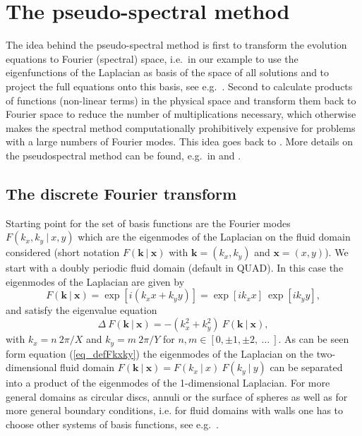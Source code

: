 \chapter{The pseudo-spectral method} \label{sec_pseudspec}
The idea behind the pseudo-spectral method is first to transform
the evolution equations to Fourier (spectral) space, i.e.\ in our
example to use the eigenfunctions of the Laplacian as basis of the
space of all solutions and to project the full equations onto this basis,
see e.g.\ \cite{canutoetal1988}. Second to calculate products of functions
(non-linear terms) in the physical space and transform them back
to Fourier space to reduce the number of multiplications necessary,
which otherwise makes the spectral method computationally prohibitively
expensive for problems with a large numbers of Fourier modes. This idea
goes back to \cite{kreissandoliger1972}. More details on the
pseudospectral method can be found, e.g.\ in \cite{orszag1972}
and \cite{fornberg1987}.
%
\section{The discrete Fourier transform}
%
\label{ssec_evolfourier}
Starting point for the set of basis functions are the Fourier modes 
$F(k_{x},k_{y} \ | \ x,y)$ which are the eigenmodes of the Laplacian 
on the fluid domain considered (short notation 
$F(\mathbf{k} \ | \ \mathbf{x})$ with 
$\mathbf{k} = (k_{x},k_{y})$ and $\mathbf{x} = (x,y)$).  
We start with a doubly periodic fluid domain (default in QUAD). 
In this case the eigenmodes of the Laplacian are given by
\begin{equation} \label{eq_defFkxky}
  F(\mathbf{k} \ | \ \mathbf{x}) 
   = 
 \exp \left[ i  \left(k_{x} x + k_{y} y \right) \right]
   = 
 \exp \left[ i k_{x} x \right] \ 
 \exp \left[ i k_{y} y \right],
\end{equation}
and satisfy the eigenvalue equation
\begin{equation} \label{eq_eigFkxky}
 \Delta \ F(\mathbf{k} \ | \ \mathbf{x})
   =
  - \left( k_{x}^{2} + k_{y}^{2} \right) \ 
    F(\mathbf{k} \ | \ \mathbf{x}),
\end{equation}
with $k_{x} = n \ 2 \pi/X$ and $k_{y} = m \ 2 \pi/Y$ for 
$n,m \in [0,\pm 1, \pm 2,\ \dots \ ]$. As can be seen form equation 
(\ref{eq_defFkxky}) the eigenmodes of the Laplacian on the 
two-dimensional fluid domain 
$F(\mathbf{k} \ | \ \mathbf{x}) = F(k_{x} \ | \ x) \ F(k_{y} \ | \ y)$
can be separated into a product of the eigenmodes of the 
1-dimensional Laplacian. For more general domains
as circular discs, annuli or the surface of spheres as well as 
for more general boundary conditions, i.e. for fluid domains with walls 
one has to choose other systems of basis functions, 
see e.g.\ \cite{canutoetal1988}.

